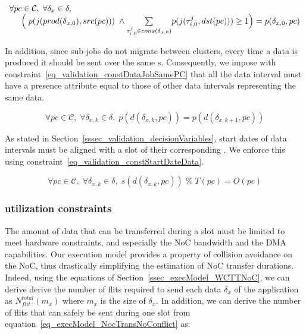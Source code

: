 \documentclass[main.tex]{subfiles}
\begin{document}
\begin{equation}
    \label{eq_validation_constDataPCmapping}
    \begin{array}{l}
        \forall pc \in \mathcal{C}, \; \forall \delta_{x} \in \delta,  \\
        \hspace{5mm} \Big( \; p(j(prod(\delta_{x,0}), src(pc))) \; \land \underset{\tau_{i,0}^j \in cons(\delta_{x,0})}{\sum} p(j(\tau_{i,0}^j , dst(pc))) \geq 1   \Big)  = p( \delta_{x,0} , pc  ) 
    \end{array}
\end{equation}

In addition, since sub-jobs do not migrate between clusters, every time a data is produced it should be sent over the same \PC{}s. Consequently, we impose with constraint~\ref{eq_validation_constDataJobSamePC} that all the data interval must have a presence attribute equal to those of other data intervals representing the same data.

\begin{equation}
    \label{eq_validation_constDataJobSamePC}
    \forall pc \in \mathcal{C}, \; \forall \delta_{x,k} \in \delta, \; 
    p( d( \delta_{x,k} , pc ) ) = p( d( \delta_{x,k+1} , pc ) )
\end{equation}

As stated in Section~\ref{sssec_validation_decisionVariables}, start dates of data intervals must be aligned with a slot of their corresponding \PC{}. We enforce this using constraint~\ref{eq_validation_constStartDateData}.

\begin{equation}
    \label{eq_validation_constStartDateData}
    \forall pc \in \mathcal{C}, \; \forall \delta_{x,k} \in \delta, \; 
    s( d( \delta_{x,k}, pc ) ) \; \% \; T(pc) = O(pc)
\end{equation}

\subsubsection{\PC{} utilization constraints}
\label{sssec_validation_PCutilConst}
The amount of data that can be transferred during a \PC{} slot must be limited to meet hardware constraints, and especially the NoC bandwidth and the DMA capabilities. Our execution model provides a property of collision avoidance on the NoC, thus drastically simplifying the estimation of NoC transfer durations. Indeed, using the equations of Section~\ref{ssec_execModel_WCTTNoC}, we can derive derive the number of flits required to send each data $\delta_x$ of the application as $N_{flit}^{total} ( m_x )$ where $m_x$ is the size of $\delta_x$. In addition, we can derive the number of flits that can safely be sent during one \PC{} slot from equation~\ref{eq_execModel_NocTransNoConflict} as:
\end{document}
